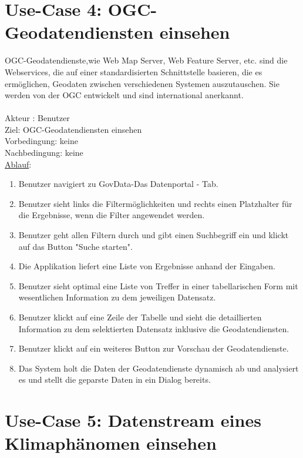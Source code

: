 \documentclass[a4paper,12pt]{scrreprt}
\begin{document}
\section*{\small \textbf{Use-Case 4: OGC-Geodatendiensten einsehen}}
OGC-Geodatendienste,wie Web Map Server, Web Feature Server, etc. sind die Webservices, die auf einer standardisierten Schnittstelle basieren, die es ermöglichen, Geodaten zwischen verschiedenen Systemen auszutauschen. Sie werden von der OGC entwickelt und sind international anerkannt.\\\\
Akteur : Benutzer\\
Ziel:  OGC-Geodatendiensten einsehen\\
Vorbedingung: keine\\
Nachbedingung: keine\\
\underline{Ablauf}:
\begin{enumerate}
\item Benutzer navigiert zu GovData-Das Datenportal - Tab.
\item Benutzer sieht links die Filtermöglichkeiten und rechts einen Platzhalter für die Ergebnisse, wenn die Filter angewendet werden.
\item Benutzer geht allen Filtern durch und gibt einen Suchbegriff ein und klickt auf das Button "Suche starten".
\item Die Applikation liefert eine Liste von Ergebnisse anhand der Eingaben.
\item Benutzer sieht optimal eine Liste von Treffer in einer tabellarischen Form mit wesentlichen Information zu dem jeweiligen Datensatz.
\item Benutzer klickt auf eine Zeile der Tabelle und sieht die detaillierten Information zu dem selektierten Datensatz inklusive die Geodatendiensten.
\item Benutzer klickt auf ein weiteres Button zur Vorschau der Geodatendienste.
\item Das System holt die Daten der Geodatendienste dynamisch ab und analysiert es und stellt die geparste Daten in ein Dialog bereits. 	
\end{enumerate}
\section*{\small \textbf{Use-Case 5: Datenstream eines Klimaphänomen einsehen}}
\end{document}
